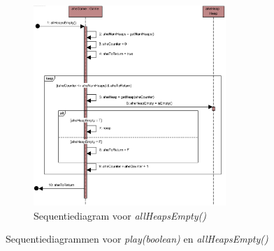 {\begin{landscape}
\begin{figure}
\begin{subfigure}{\textwidth}
			\includegraphics[width=0.8\textwidth]{chap-evaluatie/allHeapsEmpty.png}
			\caption{Sequentiediagram voor \textit{allHeapsEmpty()}}
			\label{fig:nim-allHeapsEmpty}
		\end{subfigure}
		\caption{Sequentiediagrammen voor \textit{play(boolean)} en \textit{allHeapsEmpty()}}
		\label{fig:nim-play-ahe}
	\end{figure}
\end{landscape}
}

